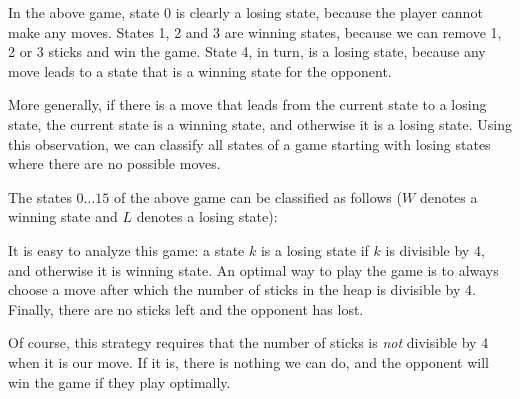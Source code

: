 In the above game, state 0 is clearly a
losing state, because the player cannot make
any moves.
States 1, 2 and 3 are winning states,
because we can remove 1, 2 or 3 sticks
and win the game.
State 4, in turn, is a losing state,
because any move leads to a state that
is a winning state for the opponent.

More generally, if there is a move that leads
from the current state to a losing state,
the current state is a winning state,
and otherwise it is a losing state.
Using this observation, we can classify all states
of a game starting with losing states where
there are no possible moves.

The states $0 \ldots 15$ of the above game
can be classified as follows
($W$ denotes a winning state and $L$ denotes a losing state):
\begin{center}
\end{center}

It is easy to analyze this game:
a state $k$ is a losing state if $k$ is
divisible by 4, and otherwise it
is winning state.
An optimal way to play the game is
to always choose a move after which
the number of sticks in the heap
is divisible by 4.
Finally, there are no sticks left and
the opponent has lost.

Of course, this strategy requires that
the number of sticks is \emph{not} divisible by 4
when it is our move.
If it is, there is nothing we can do,
and the opponent will win the game if
they play optimally.

